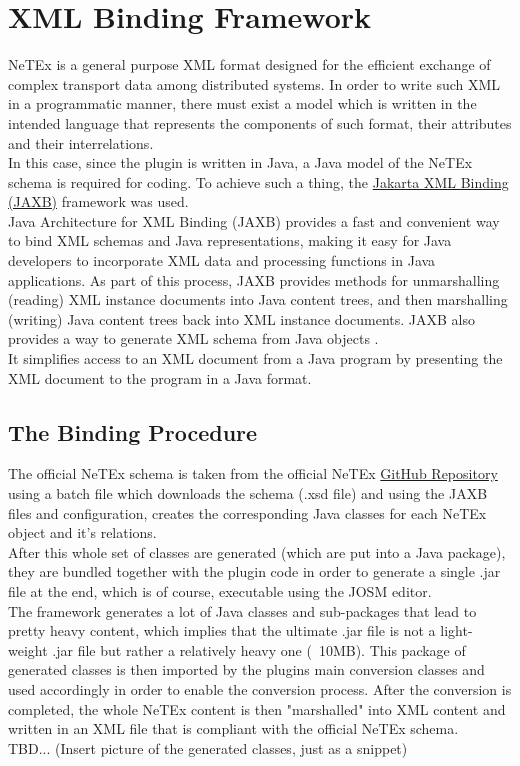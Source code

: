 \section{XML Binding Framework}
NeTEx is a general purpose XML format designed for the efficient exchange of complex transport data among distributed systems. In order to write such XML in a programmatic manner, there must exist a model which is written in the intended language that represents the components of such format, their attributes and their interrelations.\\
In this case, since the plugin is written in Java, a Java model of the NeTEx schema is required for coding. To achieve such a thing, the \href{https://en.wikipedia.org/wiki/Jakarta_XML_Binding}{Jakarta XML Binding (JAXB)} framework was used.\\
\newline
Java Architecture for XML Binding (JAXB) provides a fast and convenient way to bind XML schemas and Java representations, making it easy for Java developers to incorporate XML data and processing functions in Java applications. As part of this process, JAXB provides methods for unmarshalling (reading) XML instance documents into Java content trees, and then marshalling (writing) Java content trees back into XML instance documents. JAXB also provides a way to generate XML schema from Java objects . \cite{WhatIsJAXB}\\ 
It simplifies access to an XML document from a Java program by presenting the XML document to the program in a Java format.
\subsection{The Binding Procedure}
The official NeTEx schema is taken from the official NeTEx \href{https://github.com/NeTEx-CEN/NeTEx}{GitHub Repository} using a batch file which downloads the schema (.xsd file) and using the JAXB files and configuration, creates the corresponding Java classes for each NeTEx object and it's relations.\\
After this whole set of classes are generated (which are put into a Java package), they are bundled together with the plugin code in order to generate a single .jar file at the end, which is of course, executable using the JOSM editor.\\
The framework generates a lot of Java classes and sub-packages that lead to pretty heavy content, which implies that the ultimate .jar file is not a light-weight .jar file but rather a relatively heavy one (~10MB). This package of generated classes is then imported by the plugins main conversion classes and used accordingly in order to enable the conversion process. After the conversion is completed, the whole NeTEx content is then "marshalled" into XML content and written in an XML file that is compliant with the official NeTEx schema.\\
TBD... (Insert picture of the generated classes, just as a snippet)
\newpage
